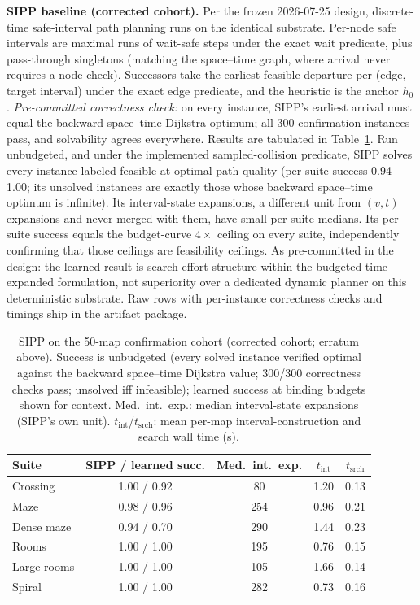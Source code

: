 \documentclass[letterpaper]{article} %
\begin{document}
\textbf{SIPP baseline (corrected cohort).} Per the frozen 2026-07-25 design, discrete-time safe-interval path planning runs on the identical substrate. Per-node safe intervals are maximal runs of wait-safe steps under the exact wait predicate, plus pass-through singletons (matching the space--time graph, where arrival never requires a node check). Successors take the earliest feasible departure per (edge, target interval) under the exact edge predicate, and the heuristic is the anchor $h_0$. \emph{Pre-committed correctness check:} on every instance, SIPP's earliest arrival must equal the backward space--time Dijkstra optimum; all 300 confirmation instances pass, and solvability agrees everywhere. Results are tabulated in Table~\ref{tab:sipp}. Run unbudgeted, and under the implemented sampled-collision predicate, SIPP solves every instance labeled feasible at optimal path quality (per-suite success 0.94--1.00; its unsolved instances are exactly those whose backward space--time optimum is infinite). Its interval-state expansions, a different unit from $(v,t)$ expansions and never merged with them, have small per-suite medians. Its per-suite success equals the budget-curve $4\times$ ceiling on every suite, independently confirming that those ceilings are feasibility ceilings. As pre-committed in the design: the learned result is search-effort structure within the budgeted time-expanded formulation, not superiority over a dedicated dynamic planner on this deterministic substrate. Raw rows with per-instance correctness checks and timings ship in the artifact package.

\begin{table}[t]
\centering
\small
\setlength{\tabcolsep}{2.6pt}
\begin{tabular}{@{}lcccc@{}}
\toprule
Suite & SIPP / learned succ. & Med.\ int.\ exp. & $t_{\mathrm{int}}$ & $t_{\mathrm{srch}}$ \\
\midrule
Crossing & 1.00 / 0.92 & 80 & 1.20 & 0.13 \\
Maze & 0.98 / 0.96 & 254 & 0.96 & 0.21 \\
Dense maze & 0.94 / 0.70 & 290 & 1.44 & 0.23 \\
Rooms & 1.00 / 1.00 & 195 & 0.76 & 0.15 \\
Large rooms & 1.00 / 1.00 & 105 & 1.66 & 0.14 \\
Spiral & 1.00 / 1.00 & 282 & 0.73 & 0.16 \\
\bottomrule
\end{tabular}
\caption{SIPP on the 50-map confirmation cohort (corrected cohort; erratum above). Success is unbudgeted (every solved instance verified optimal against the backward space--time Dijkstra value; 300/300 correctness checks pass; unsolved iff infeasible); learned success at binding budgets shown for context. Med.\ int.\ exp.: median interval-state expansions (SIPP's own unit). $t_{\mathrm{int}}$/$t_{\mathrm{srch}}$: mean per-map interval-construction and search wall time (s).}
\label{tab:sipp}
\end{table}
\end{document}
